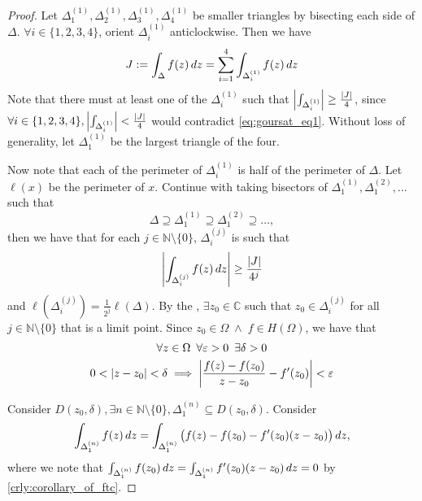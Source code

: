 \documentclass[11pt, oneside]{book}
\begin{document}
\begin{proof}
	Let $\Delta_1^{(1)}, \Delta_2^{(1)}, \Delta_3^{(1)}, \Delta_4^{(1)}$ be smaller triangles by bisecting each side of $\Delta$. $\forall i \in \{1, 2, 3, 4\}$, orient $\Delta_i^{(1)}$ anticlockwise. Then we have
	\begin{equation}\label{eq:goursat_eq1}
		J := \int_{\Delta} f(z) \mathop{}\!d{z} = \sum_{i=1}^{4} \int_{\Delta_i^{(1)}} f(z) \mathop{}\!d{z} 
	\end{equation}
	Note that there must at least one of the $\Delta_i^{(1)}$ such that $\left|\int_{\Delta_i^{(1)}} \right| \geq \frac{\left|J\right|}{4}$, since $\forall i \in \{1, 2, 3, 4\}, \left|\int_{\Delta_i^{(1)}} \right| < \frac{\left|J\right|}{4}$ would contradict \cref{eq:goursat_eq1}. Without loss of generality, let $\Delta_1^{(1)}$ be the largest triangle of the four.

	Now note that each of the perimeter of $\Delta_i^{(1)}$ is half of the perimeter of $\Delta$. Let $\ell(x)$ be the perimeter of $x$. Continue with taking bisectors of $\Delta_1^{(1)}, \Delta_1^{(2)}, \hdots$ such that
	\begin{equation*}
		\Delta \supseteq \Delta_1^{(1)} \supseteq \Delta_1^{(2)} \supseteq \hdots,
	\end{equation*}
	then we have that for each $j \in \mathbb{N} \setminus \{0\}$, $\Delta_i^{(j)}$ is such that
	\begin{equation*}
		\left|\int_{\Delta_i^{(j)}} f(z) \mathop{}\!d{z}\right| \geq \frac{\left|J\right|}{4^j} 
	\end{equation*}
	and $\ell(\Delta_i^{(j)}) = \frac{1}{2^j} \ell (\Delta)$. By the , $\exists z_0 \in \mathbb{C}$ such that $z_0 \in \Delta_i^{(j)}$ for all $j \in \mathbb{N} \setminus \{0\}$ that is a limit point. Since $z_0 \in \Omega \; \land \; f \in H(\Omega)$, we have that
	\begin{gather*}
		\forall z \in \Omega \enspace \forall \varepsilon > 0 \enspace \exists \delta > 0 \\
		0 < \left|z - z_0\right| < \delta \implies \left|\frac{f(z) - f(z_0)}{z - z_0} - f'(z_0)\right| < \varepsilon
	\end{gather*}

	Consider $D(z_0, \delta), \exists n \in \mathbb{N} \setminus \{0\}, \Delta_1^{(n)} \subseteq D(z_0, \delta)$. Consider
	\begin{equation*}
		\int_{\Delta_1^{(n)}} f(z) \mathop{}\!d{z} = \int_{\Delta_1^{(n)}} \big(f(z) - f(z_0) - f'(z_0)(z - z_0)\big) \mathop{}\!d{z},
	\end{equation*}
	where we note that $\int_{\Delta_1^{(n)}} f(z_0) \mathop{}\!d{z} = \int_{\Delta_1^{(n)}} f'(z_0)(z - z_0) \mathop{}\!d{z} = 0$ by \cref{crly:corollary_of_ftc}.


\end{proof}
\end{document}
